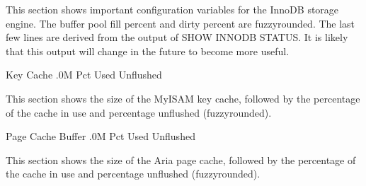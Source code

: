 \documentclass[letterpaper,10pt,english]{sphinxmanual}
\begin{document}
\sphinxAtStartPar
This section shows important configuration variables for the InnoDB storage
engine. The buffer pool fill percent and dirty percent are fuzzy\sphinxhyphen{}rounded. The
last few lines are derived from the output of SHOW INNODB STATUS. It is likely
that this output will change in the future to become more useful.

\begin{sphinxVerbatim}[commandchars=\\\{\}]
                Key Cache  .0M
                 Pct Used  \PYGZpc{}
                Unflushed  \PYGZpc{}
\end{sphinxVerbatim}

\sphinxAtStartPar
This section shows the size of the MyISAM key cache, followed by the percentage
of the cache in use and percentage unflushed (fuzzy\sphinxhyphen{}rounded).

\begin{sphinxVerbatim}[commandchars=\\\{\}]
        Page Cache Buffer  .0M
                 Pct Used  \PYGZpc{}
                Unflushed  \PYGZpc{}
\end{sphinxVerbatim}

\sphinxAtStartPar
This section shows the size of the Aria page cache, followed by the percentage
of the cache in use and percentage unflushed (fuzzy\sphinxhyphen{}rounded).
\end{document}
